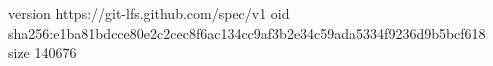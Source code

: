 version https://git-lfs.github.com/spec/v1
oid sha256:e1ba81bdcce80e2c2cec8f6ac134cc9af3b2e34c59ada5334f9236d9b5bcf618
size 140676

